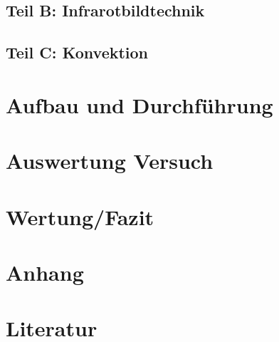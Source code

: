 \documentclass[a4paper]{scrartcl}
\numberwithin{equation}{subsection}
\begin{document}
\subsection{Teil B: Infrarotbildtechnik}
\subsection{Teil C: Konvektion}
\newpage
\section{Aufbau und Durchführung}

\newpage
\section{Auswertung Versuch}

\newpage
\section{Wertung/Fazit}

\newpage
\section{Anhang}

\newpage
\section{Literatur}

\label{LastPage}
\end{document}
